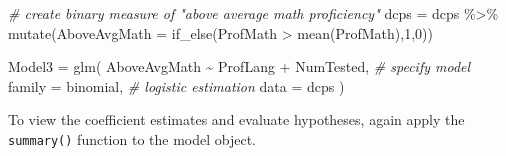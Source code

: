 \documentclass[
  12pt,
]{krantz}
\newenvironment{Shaded}{\begin{snugshade}}{\end{snugshade}}
\newcommand{\AttributeTok}[1]{\textcolor[rgb]{0.77,0.63,0.00}{#1}}
\newcommand{\CommentTok}[1]{\textcolor[rgb]{0.56,0.35,0.01}{\textit{#1}}}
\newcommand{\DecValTok}[1]{\textcolor[rgb]{0.00,0.00,0.81}{#1}}
\newcommand{\FunctionTok}[1]{\textcolor[rgb]{0.00,0.00,0.00}{#1}}
\newcommand{\NormalTok}[1]{#1}
\newcommand{\OtherTok}[1]{\textcolor[rgb]{0.56,0.35,0.01}{#1}}
\newcommand{\SpecialCharTok}[1]{\textcolor[rgb]{0.00,0.00,0.00}{#1}}
\newcommand{\StringTok}[1]{\textcolor[rgb]{0.31,0.60,0.02}{#1}}
\begin{document}
\begin{Shaded}
\begin{Highlighting}[]
\CommentTok{\# create binary measure of "above average math proficiency"}
\NormalTok{  dcps }\OtherTok{=}
\NormalTok{    dcps }\SpecialCharTok{\%\textgreater{}\%}
    \FunctionTok{mutate}\NormalTok{(}\AttributeTok{AboveAvgMath =} \FunctionTok{if\_else}\NormalTok{(ProfMath }\SpecialCharTok{\textgreater{}} \FunctionTok{mean}\NormalTok{(ProfMath),}\DecValTok{1}\NormalTok{,}\DecValTok{0}\NormalTok{))}

\NormalTok{  Model3 }\OtherTok{=} 
    \FunctionTok{glm}\NormalTok{(}
\NormalTok{      AboveAvgMath }\SpecialCharTok{\textasciitilde{}}\NormalTok{ ProfLang }\SpecialCharTok{+}\NormalTok{ NumTested,  }\CommentTok{\# specify model}
      \AttributeTok{family =} \StringTok{\textquotesingle{}binomial\textquotesingle{}}\NormalTok{,  }\CommentTok{\# logistic estimation}
      \AttributeTok{data =}\NormalTok{ dcps}
\NormalTok{    )}
\end{Highlighting}
\end{Shaded}

To view the coefficient estimates and evaluate hypotheses, again apply the \texttt{summary()} function to the model object.
\end{document}
